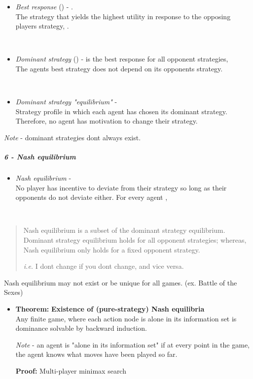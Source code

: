 \documentclass[
]{article}
\providecommand{\tightlist}{%
  \setlength{\itemsep}{0pt}\setlength{\parskip}{0pt}}
\begin{document}
\begin{itemize}
\item
  {\emph{Best response}} ({}) - {} .\\
  The strategy that yields the highest utility in response to the
  opposing player\textquotesingle s strategy, {} .\\
  \strut \\
\item
  {\emph{Dominant strategy}} ({}) - {} is the best response for all
  opponent strategies, {}\\
  The agent\textquotesingle s best strategy does not depend on its
  opponent\textquotesingle s strategy.\\
  \strut \\
\item
  {\emph{Dominant strategy "equilibrium"}} -\\
  Strategy profile in which each agent has chosen its dominant
  strategy.\\
  Therefore, no agent has motivation to change their strategy.
\end{itemize}

\emph{Note} - dominant strategies don\textquotesingle t always exist.

\subparagraph{6 - Nash equilibrium}\label{nash-equilibrium}

\begin{itemize}
\tightlist
\item
  {\emph{Nash equilibrium}} -\\
  No player has incentive to deviate from their strategy so long as
  their opponents do not deviate either. For every agent {}, {}\\
  \strut \\
\end{itemize}

\begin{quote}
Nash equilibrium is a subset of the dominant strategy equilibrium.
Dominant strategy equilibrium holds for all opponent strategies;
whereas, Nash equilibrium only holds for a fixed opponent strategy.

\emph{i.e.} I don\textquotesingle t change if you don\textquotesingle t
change, and vice versa.
\end{quote}

\hfill\break

Nash equilibrium may not exist or be unique for all games. (ex. Battle
of the Sexes)

\begin{itemize}
\item
  {\textbf{Theorem:}} \textbf{Existence of (pure-strategy) Nash
  equilibria}\\
  Any finite game, where each action node is alone in its information
  set is dominance solvable by backward induction.

  \emph{Note} - an agent is "alone in its information set" if at every
  point in the game, the agent knows what moves have been played so far.

  \textbf{Proof:} Multi-player minimax search
\end{itemize}
\end{document}
